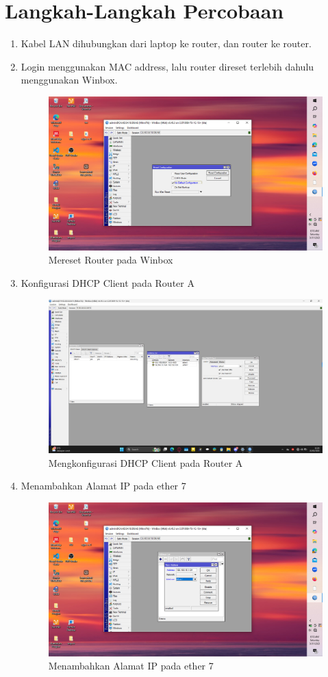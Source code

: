 \section{Langkah-Langkah Percobaan}
\begin{enumerate}
    \item Kabel LAN dihubungkan dari laptop ke router, dan router ke router.
    \item Login menggunakan MAC address, lalu router direset terlebih dahulu menggunakan Winbox.
    \begin{figure}[H]
        \centering
        \includegraphics[width=0.5\linewidth]{gambar1.jpeg}
        \caption{Mereset Router pada Winbox}
        \label{fig:reset-router}
    \end{figure}
    \item Konfigurasi DHCP Client pada Router A
    \begin{figure}[H]
        \centering
        \includegraphics[width=0.5\linewidth]{gambar2.jpeg}
        \caption{Mengkonfigurasi DHCP Client pada Router A}
        \label{fig:DHCP-router-A}
    \end{figure}
    \item Menambahkan Alamat IP pada ether 7
    \begin{figure}[H]
        \centering
        \includegraphics[width=0.5\linewidth]{gambar3.jpeg}
        \caption{Menambahkan Alamat IP pada ether 7}

\end{figure}
\end{enumerate}
